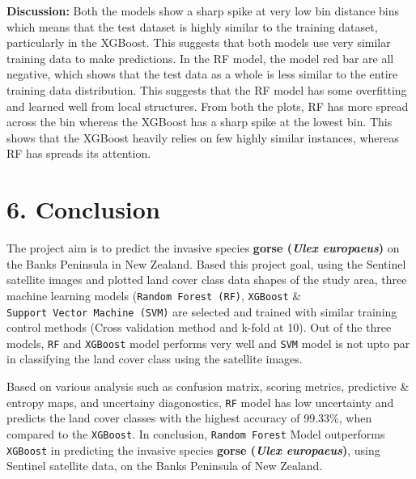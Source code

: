 \documentclass[
]{article}
\begin{document}
\textbf{Discussion:} Both the models show a sharp spike at very low bin
distance bins which means that the test dataset is highly similar to the
training dataset, particularly in the XGBoost. This suggests that both
models use very similar training data to make predictions. In the RF
model, the model red bar are all negative, which shows that the test
data as a whole is less similar to the entire training data
distribution. This suggests that the RF model has some overfitting and
learned well from local structures. From both the plots, RF has more
spread across the bin whereas the XGBoost has a sharp spike at the
lowest bin. This shows that the XGBoost heavily relies on few highly
similar instances, whereas RF has spreads its attention.

\section{6. Conclusion}\label{conclusion}

The project aim is to predict the invasive species \textbf{gorse
(\emph{Ulex europaeus})} on the Banks Peninsula in New Zealand. Based
this project goal, using the Sentinel satellite images and plotted land
cover class data shapes of the study area, three machine learning models
(\texttt{Random\ Forest\ (RF)}, \texttt{XGBoost} \&
\texttt{Support\ Vector\ Machine\ (SVM)} are selected and trained with
similar training control methods (Cross validation method and k-fold at
10). Out of the three models, \texttt{RF} and \texttt{XGBoost} model
performs very well and \texttt{SVM} model is not upto par in classifying
the land cover class using the satellite images.

Based on various analysis such as confusion matrix, scoring metrics,
predictive \& entropy maps, and uncertainy diagonostics, \texttt{RF}
model has low uncertainty and predicts the land cover classes with the
highest accuracy of 99.33\%, when compared to the \texttt{XGBoost}. In
conclusion, \texttt{Random\ Forest} Model outperforms \texttt{XGBoost}
in predicting the invasive species \textbf{gorse (\emph{Ulex
europaeus})}, using Sentinel satellite data, on the Banks Peninsula of
New Zealand.
\end{document}
